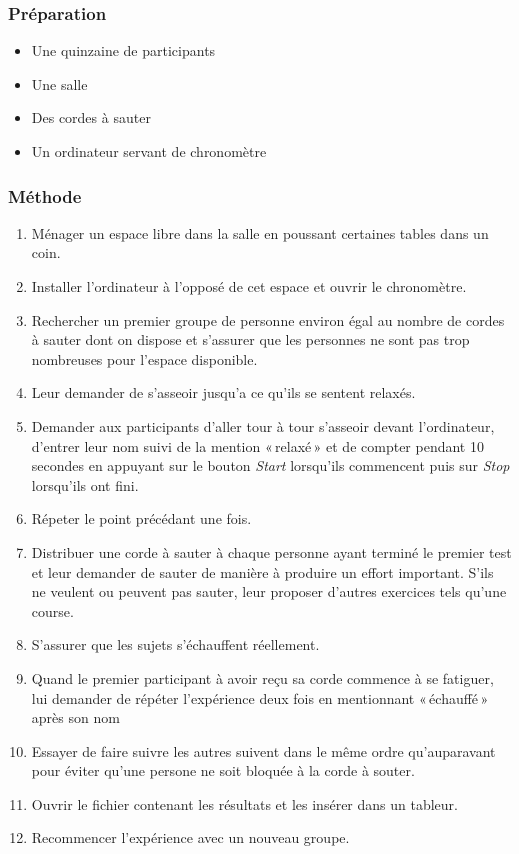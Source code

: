 \documentclass[12pt,fleqn,oneside,french,openany]{book} %
\begin{document}
\subsubsection{Préparation} \label{sssec:preparation2.2}
\begin{itemize}
	\item Une quinzaine de participants 
	\item Une salle
	\item Des cordes à sauter
	\item Un ordinateur servant de chronomètre
\end{itemize}

\subsubsection{Méthode} \label{sssec:methode2.2}
\begin{enumerate}
	\item Ménager un espace libre dans la salle en poussant certaines tables dans un coin.
	\item Installer l'ordinateur à l'opposé de cet espace et ouvrir le chronomètre.
	\item Rechercher un premier groupe de personne environ égal au nombre de cordes à sauter dont on dispose et s'assurer que les personnes ne sont pas trop nombreuses pour l'espace disponible.
	\item Leur demander de s'asseoir jusqu'a ce qu'ils se sentent relaxés.
	\item Demander aux participants d'aller tour à tour s'asseoir devant l'ordinateur, d'entrer leur nom suivi de la mention «\,relaxé\,» et de compter pendant 10 secondes en appuyant sur le bouton \emph{Start} lorsqu'ils commencent puis sur \emph{Stop} lorsqu'ils ont fini.
	\item Répeter le point précédant une fois.
	\item Distribuer une corde à sauter à chaque personne ayant terminé le premier test et leur demander de sauter de manière à produire un effort important. S'ils ne veulent ou peuvent pas sauter, leur proposer d'autres exercices tels qu'une course.
	\item S'assurer que les sujets s'échauffent réellement.
	\item Quand le premier participant à avoir reçu sa corde commence à se fatiguer, lui demander de répéter l'expérience deux fois en mentionnant «\,échauffé\,» après son nom
	\item Essayer de faire suivre les autres suivent dans le même ordre qu'auparavant pour éviter qu'une persone ne soit bloquée à la corde à souter.
	\item Ouvrir le fichier contenant les résultats et les insérer dans un tableur.
	\item Recommencer l'expérience avec un nouveau groupe.
\end{enumerate}
\end{document}
